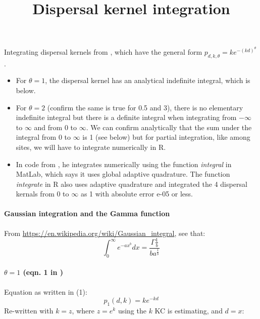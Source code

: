 \documentclass[12pt, oneside]{article}   	%
\title{Dispersal kernel integration}
\begin{document}
\date{}
\maketitle{}
Integrating dispersal kernels from \cite{bode2018estimating}, which have the general form $p_{d,k,\theta} = k e^{-(kd)^\theta}$. 
\begin{itemize}
\item For $\theta = 1$, the dispersal kernel has an analytical indefinite integral, which is below. 
\item For $\theta = 2$ (confirm the same is true for 0.5 and 3), there is no elementary indefinite integral but there is a definite integral when integrating from $-\infty$ to $\infty$ and from 0 to $\infty$. We can confirm analytically that the sum under the integral from 0 to $\infty$ is 1 (see below) but for partial integration, like among sites, we will have to integrate numerically in R. 
\item In code from \cite{bode2018estimating}, he integrates numerically using the function \textit{integral} in MatLab, which says it uses global adaptive quadrature. The function \textit{integrate} in R also uses adaptive quadrature and integrated the 4 dispersal kernals from 0 to $\infty$ as 1 with absolute error e-05 or less.
\end{itemize}

\paragraph*{Gaussian integration and the Gamma function}
From \url{https://en.wikipedia.org/wiki/Gaussian_integral}, see that:
\begin{equation}
\int_0^{\infty} e^{-ax^b} dx = \frac{\Gamma{\frac{1}{b}}}{ba^{\frac{1}{b}}} \label{Gaussian_int}
\end{equation}

\paragraph*{$\theta = 1$ (eqn. 1 in \cite{bode2018estimating})}
Equation as written in \cite{bode2018estimating} (1):
\begin{equation}
p_1(d,k) = k e^{-kd}
\end{equation}
Re-written with $k = z$, where $z = e^k$ using the $k$ KC is estimating, and $d = x$:
\end{document}
